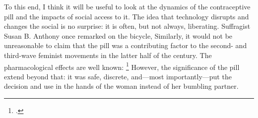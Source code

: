 \documentclass[letterpaper,notitlepage,12pt]{article}
\begin{document}


To this end, I think it will be useful to look at the dynamics of the
contraceptive pill and the impacts of social access to it.
The idea that technology disrupts and changes the social is no surprise: it is
often, but not always, liberating.
Suffragist Susan B. Anthony once remarked on the bicycle, 
Similarly, it would not be unreasonable to claim that the pill was a
contributing factor to the second- and third-wave feminist movements in the
latter half of the  century. The pharmacological effects are well known:
\footcite[p.
731]{goldin_power_2002} However, the significance of the pill extend beyond that:
it was safe, discrete, and---most importantly---put the decision and use in the 
hands of the woman instead of her bumbling partner.
\end{document}
